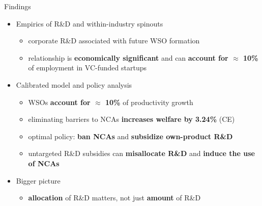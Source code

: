 \documentclass[english,usenames,dvipsnames]{beamer}
\begin{document}
\begin{frame}{Findings}\label{intro_findings}
	\begin{itemize}
		\item<+-> Empirics of R\&D and within-industry spinouts
		\begin{itemize}
			\item corporate R\&D associated with future WSO formation
			\item relationship is \alert{\textbf{economically significant}} and can \alert{\textbf{account for $\approx$ 10\%}} of employment in VC-funded startups   
		\end{itemize}
		\medskip
		\item<+-> Calibrated model and policy analysis
		\begin{itemize}
			\item WSOs \alert{\textbf{account for $\approx$ 10\%}} of productivity growth
			\item eliminating barriers to NCAs \alert{\textbf{increases welfare by 3.24\%}} (CE)
			\item optimal policy: \alert{\textbf{ban NCAs}} and \alert{\textbf{subsidize own-product R\&D}} 
			\item untargeted R\&D subsidies can \alert{\textbf{misallocate R\&D}} and \alert{\textbf{induce the use of NCAs}}
		\end{itemize}
		\medskip
		\item<+-> Bigger picture
		\begin{itemize}
			\item \alert{\textbf{allocation}} of R\&D matters, not just \alert{\textbf{amount}} of R\&D
		\end{itemize}
	\end{itemize}
\end{frame}
\end{document}
